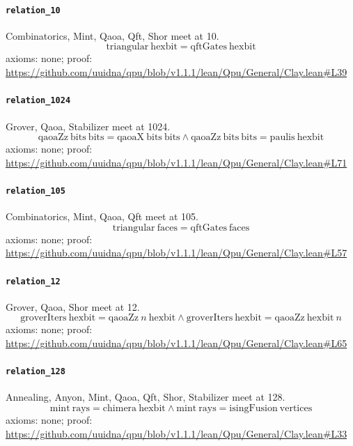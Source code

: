 \documentclass[11pt]{article}
\begin{document}
\paragraph{\texttt{relation\_10}}
Combinatorics, Mint, Qaoa, Qft, Shor meet at 10.
\[ \mathrm{triangular}\ \mathrm{hexbit} = \mathrm{qftGates}\ \mathrm{hexbit} \]
\noindent axioms: none; proof: \url{https://github.com/uuidna/qpu/blob/v1.1.1/lean/Qpu/General/Clay.lean\#L39}

\paragraph{\texttt{relation\_1024}}
Grover, Qaoa, Stabilizer meet at 1024.
\[ \mathrm{qaoaZz}\ \mathrm{bits}\ \mathrm{bits} = \mathrm{qaoaX}\ \mathrm{bits}\ \mathrm{bits} \land \mathrm{qaoaZz}\ \mathrm{bits}\ \mathrm{bits} = \mathrm{paulis}\ \mathrm{hexbit} \]
\noindent axioms: none; proof: \url{https://github.com/uuidna/qpu/blob/v1.1.1/lean/Qpu/General/Clay.lean\#L71}

\paragraph{\texttt{relation\_105}}
Combinatorics, Mint, Qaoa, Qft meet at 105.
\[ \mathrm{triangular}\ \mathrm{faces} = \mathrm{qftGates}\ \mathrm{faces} \]
\noindent axioms: none; proof: \url{https://github.com/uuidna/qpu/blob/v1.1.1/lean/Qpu/General/Clay.lean\#L57}

\paragraph{\texttt{relation\_12}}
Grover, Qaoa, Shor meet at 12.
\[ \mathrm{groverIters}\ \mathrm{hexbit} = \mathrm{qaoaZz}\ n\ \mathrm{hexbit} \land \mathrm{groverIters}\ \mathrm{hexbit} = \mathrm{qaoaZz}\ \mathrm{hexbit}\ n \]
\noindent axioms: none; proof: \url{https://github.com/uuidna/qpu/blob/v1.1.1/lean/Qpu/General/Clay.lean\#L65}

\paragraph{\texttt{relation\_128}}
Annealing, Anyon, Mint, Qaoa, Qft, Shor, Stabilizer meet at 128.
\[ \mathrm{mint}\ \mathrm{rays} = \mathrm{chimera}\ \mathrm{hexbit} \land \mathrm{mint}\ \mathrm{rays} = \mathrm{isingFusion}\ \mathrm{vertices} \]
\noindent axioms: none; proof: \url{https://github.com/uuidna/qpu/blob/v1.1.1/lean/Qpu/General/Clay.lean\#L33}
\end{document}
